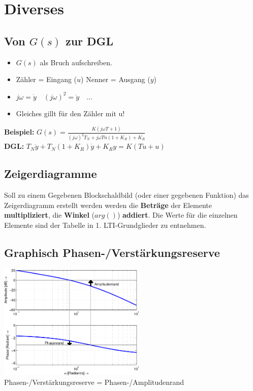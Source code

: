 \section{Diverses}
    \subsection{Von $G(s)$ zur DGL}
    	\begin{multicols}{2}
    		\begin{itemize}
  				\item $G(s)$ als Bruch aufschreiben.
  				\item Zähler = Eingang ($u$) \quad Nenner = Ausgang ($y$)
  				\item $j\omega = \dot{y} \quad (j\omega)^2 = \ddot{y} \quad \ldots $
  				\item Gleiches gillt für den Zähler mit u!
			\end{itemize}
			\columnbreak
			\textbf{Beispiel:} $G(s) = \frac{K(j \omega T + 1)}{(j\omega)^2 T_N + j \omega Tn(1+K_R) + K_R}$ \\			
			\textbf{DGL:} $T_N \ddot{y} + T_N(1+K_R) \dot{y} + K_R y = K(T \dot{u} + u)$
    	\end{multicols}    	
    
    \subsection{Zeigerdiagramme}
    Soll zu einem Gegebenen Blockschaldbild (oder einer gegebenen Funktion) das Zeigerdiagramm erstellt 
    werden werden die \textbf{Beträge} der Elemente \textbf{multipliziert},
    die \textbf{Winkel} ($arg()$) \textbf{addiert}. Die Werte für die einzelnen Elemente sind der Tabelle in 1. LTI-Grundglieder zu entnehmen. 


	\subsection{Graphisch Phasen-/Verstärkungsreserve}
		\includegraphics[width=7cm]{./images/bode-stabilitaet.png} \\
		Phasen-/Verstärkungsreserve = Phasen-/Amplitudenrand

